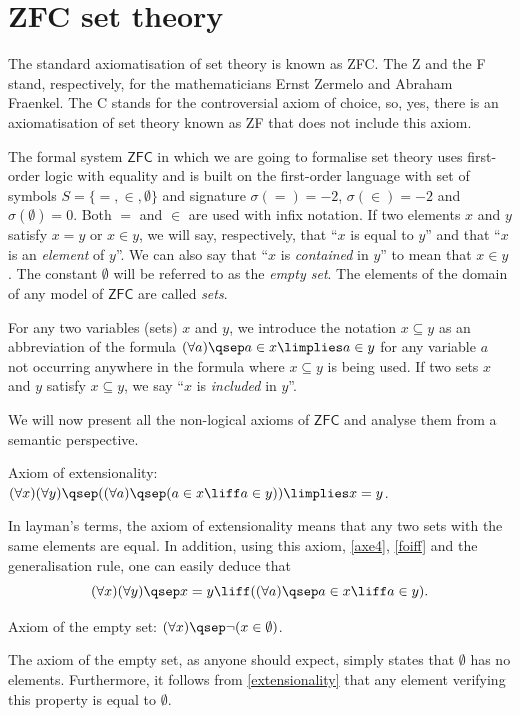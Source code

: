
\section{ZFC set theory}

\begin{para}
The standard axiomatisation of set theory is known as ZFC. The Z and the F stand, respectively, for the mathematicians Ernst Zermelo and Abraham Fraenkel. The C stands for the controversial axiom of choice, so, yes, there is an axiomatisation of set theory known as ZF that does not include this axiom.

The formal system $\mathsf{ZFC}$ in which we are going to formalise set theory uses first-order logic with equality and is built on the first-order language with set of symbols $S = \{=,\in,\emptyset\}$ and signature $\sigma(=) = -2$,  $\sigma(\in) = -2$ and $\sigma(\emptyset) = 0$. Both $=$ and $\in$ are used with infix notation.
If two elements $x$ and $y$ satisfy $x = y$ or $x\in y$, we will say, respectively, that ``$x$ is equal to $y$'' and that ``$x$ is an \emph{element} of $y$''.
We can also say that ``$x$ is \emph{contained} in $y$'' to mean that $x\in y$.
The constant $\emptyset$ will be referred to as the \emph{empty set}.
The elements of the domain of any model of $\mathsf{ZFC}$ are called \emph{sets}.

For any two variables (sets) $x$ and $y$, we introduce the notation $x\subseteq y$ as an abbreviation of the formula $(\forall a)\qsep a\in x \limplies a \in y$ for any variable $a$ not occurring anywhere in the formula where $x\subseteq y$ is being used.
If two sets $x$ and $y$ satisfy $x\subseteq y$, we say ``$x$ is \emph{included} in $y$''.

We will now present all the non-logical axioms of $\mathsf{ZFC}$ and analyse them from a semantic perspective.
\begin{axioms}[ZF]
\item \label{extensionality} Axiom of extensionality: $(\forall x)(\forall y)\qsep ((\forall a)\qsep (a \in x \liff a\in y)) \limplies x = y$.
\end{axioms}
In layman's terms, the axiom of extensionality means that any two sets with the same elements are equal.
In addition, using this axiom, \ref{axe4}, \ref{foiff} and the generalisation rule, one can easily deduce that
\[(\forall x)(\forall y)\qsep x = y \liff ((\forall a)\qsep a\in x \liff a \in y).\]

\begin{axioms}
\item \label{emptyset} Axiom of the empty set: $(\forall x)\qsep \lnot(x\in\emptyset)$.
\end{axioms}
The axiom of the empty set, as anyone should expect, simply states that $\emptyset$ has no elements. Furthermore, it follows from \ref{extensionality} that any element verifying this property is equal to $\emptyset$.


\end{para}
